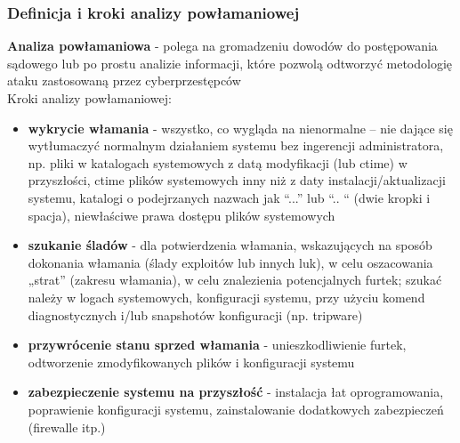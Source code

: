 \subsubsection{Definicja i kroki analizy powłamaniowej}

\textbf{Analiza powłamaniowa} - polega na gromadzeniu dowodów do postępowania sądowego lub po prostu analizie informacji, które pozwolą odtworzyć metodologię ataku zastosowaną przez cyberprzestępców \\

Kroki analizy powłamaniowej: 

\begin{itemize}
	\item \textbf{wykrycie włamania} - wszystko, co wygląda na nienormalne – nie dające się wytłumaczyć normalnym działaniem systemu bez ingerencji administratora, np. pliki w katalogach systemowych z datą modyfikacji (lub ctime) w przyszłości, ctime plików systemowych inny niż z daty instalacji/aktualizacji systemu, katalogi o podejrzanych nazwach jak “...” lub “.. “ (dwie kropki i spacja), niewłaściwe prawa dostępu plików systemowych 
	\item \textbf{szukanie śladów} - dla potwierdzenia włamania, wskazujących na sposób dokonania włamania (ślady exploitów lub innych luk), w celu oszacowania „strat” (zakresu włamania), w celu znalezienia potencjalnych furtek; szukać należy w logach systemowych, konfiguracji systemu, przy użyciu komend diagnostycznych i/lub snapshotów konfiguracji (np. tripware) 
	\item \textbf{przywrócenie stanu sprzed włamania} - unieszkodliwienie furtek, odtworzenie zmodyfikowanych plików i konfiguracji systemu 
	\item \textbf{zabezpieczenie systemu na przyszłość} - instalacja łat oprogramowania, poprawienie konfiguracji systemu, zainstalowanie dodatkowych zabezpieczeń (firewalle itp.) 
\end{itemize}

